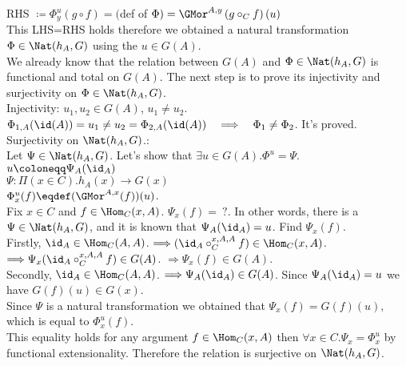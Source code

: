 \documentclass[10pt,a4paper]{article}
\begin{document}
RHS $\coloneqq \Phi^u_y(g\circ f)=($def of $\Phi)=\GMor^{A,y}\left(g\circ_C f\right)(u)$\\
This LHS=RHS holds therefore we obtained a natural transformation $\Phi\in\Nat(h_A,G)$ using the $u\in G(A)$.\\
We already know that the relation between $G(A)$ and $\Phi\in\Nat(h_A,G)$ is functional and total on $G(A)$.
The next step is to prove its injectivity and surjectivity on $\Phi\in\Nat(h_A,G)$.\\
Injectivity: $u_1,u_2\in G(A)$, $u_1\neq u_2$.\\
$\Phi_{1,A}(\id(A))= u_1\neq u_2 = \Phi_{2,A}(\id(A))\quad \Longrightarrow \quad \Phi_1 \neq \Phi_2$. It's proved. \\
Surjectivity on $\Nat(h_A,G)$.:\\
Let $\Psi\in\Nat(h_A,G)$. Let's show that $\exists u\in G(A).\Phi^u=\Psi$.\\
$u\coloneqq \Psi_A(\id_A)$\\
$\Psi:\Pi(x\in C). h_A(x)\to G(x)$\\
$\Phi^u_x(f) \eqdef (\GMor^{A,x}(f))(u)$.\\
Fix $x\in C$ and $f\in\Hom_C(x,A)$. $\Psi_x(f)=\ ?$.
In other words, there is a $\Psi\in\Nat(h_A,G)$, and it is known that $\Psi_A(\id_A) = u$. Find $\Psi_x(f)$.\\
Firstly, $\id_A \in \Hom_C(A,A)$. $\Longrightarrow (\id_A \circ_C^{x,A,A} f) \in \Hom_C(x,A)$. $\Longrightarrow \Psi_x(\id_A \circ_C^{x,A,A} f)\in G(A)$. $\Longrightarrow \Psi_x(f)\in G(A)$.\\
Secondly, $\id_A \in \Hom_C(A,A)$. $\Longrightarrow \Psi_A(\id_A) \in G(A)$. Since $\Psi_A(\id_A)=u$ we have $G(f)(u)\in G(x)$.\\
Since $\Psi$ is a natural transformation we obtained that $\Psi_x(f)=G(f)(u),$ which is equal to $\Phi^u_x(f)$.\\
This equality holds for any argument $f\in \Hom_C(x,A)$ then $\forall x\in C. \Psi_x=\Phi^u_x$ by functional extensionality. Therefore the relation is surjective on $\Nat(h_A,G)$.
\myqed\\
\end{document}
